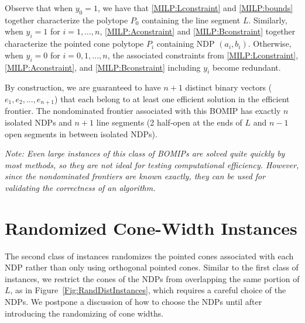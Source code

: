 \documentclass[11pt]{article} %
\begin{document}
Observe that when $y_0=1$, we have that \eqref{MILP:Lconstraint} and \eqref{MILP:bounds} together characterize the polytope $P_0$ containing the line segment $L$. Similarly, when $y_i=1$ for $i=1,...,n$, \eqref{MILP:Aconstraint} and \eqref{MILP:Bconstraint} together characterize the pointed cone polytope $P_i$ containing NDP $(a_i,b_i)$. Otherwise, when $y_i=0$ for $i=0,1,...,n$, the associated constraints from \eqref{MILP:Lconstraint}, \eqref{MILP:Aconstraint}, and \eqref{MILP:Bconstraint} including $y_i$ become redundant.

By construction, we are guaranteed to have $n+1$ distinct binary vectors ($e_1,e_2,...,e_{n+1}$) that each belong to at least one efficient solution in the efficient frontier. The nondominated frontier associated with this BOMIP has exactly $n$ isolated NDPs and $n+1$ line segments (2 half-open at the ends of $L$ and $n-1$ open segments in between isolated NDPs). 

\textit{Note: Even large instances of this class of BOMIPs are solved quite quickly by most methods, so they are not ideal for testing computational efficiency. However, since the nondominated frontiers are known exactly, they can be used for \textit{validating} the correctness of an algorithm.}

\section{Randomized Cone-Width Instances}\label{Subsec:RandDistInstances}

The second class of instances randomizes the pointed cones associated with each NDP rather than only using orthogonal pointed cones. Similar to the first class of instances, we restrict the cones of the NDPs from overlapping the same portion of $L$, as in Figure~\ref{Fig:RandDistInstances}, which requires a careful choice of the NDPs. We postpone a discussion of how to choose the NDPs until after introducing the randomizing of cone widths.
\end{document}
